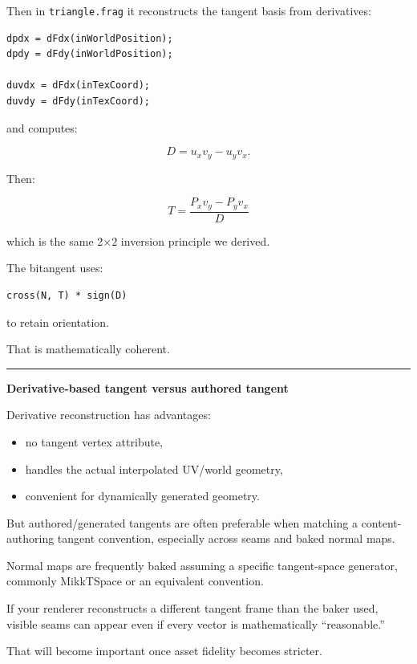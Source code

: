 Then in \texttt{triangle.frag} it reconstructs the tangent basis from derivatives:

\begin{verbatim}
dpdx = dFdx(inWorldPosition);
dpdy = dFdy(inWorldPosition);

duvdx = dFdx(inTexCoord);
duvdy = dFdy(inTexCoord);
\end{verbatim}

and computes:

\[
D=
u_xv_y-u_yv_x.
\]

Then:

\[
\boxed{
T=
\frac{
P_xv_y-P_yv_x
}{D}
}
\]

which is the same 2×2 inversion principle we derived.

The bitangent uses:

\begin{verbatim}
cross(N, T) * sign(D)
\end{verbatim}

to retain orientation.

That is mathematically coherent.

\begin{center}\rule{0.5\linewidth}{0.5pt}\end{center}

\textbf{Derivative-based tangent versus authored tangent}

Derivative reconstruction has advantages:

\begin{itemize}
\tightlist
\item
  no tangent vertex attribute,
\item
  handles the actual interpolated UV/world geometry,
\item
  convenient for dynamically generated geometry.
\end{itemize}

But authored/generated tangents are often preferable when matching a content-authoring tangent convention, especially across seams and baked normal maps.

Normal maps are frequently baked assuming a specific tangent-space generator, commonly MikkTSpace or an equivalent convention.

If your renderer reconstructs a different tangent frame than the baker used, visible seams can appear even if every vector is mathematically ``reasonable.''

That will become important once asset fidelity becomes stricter.

